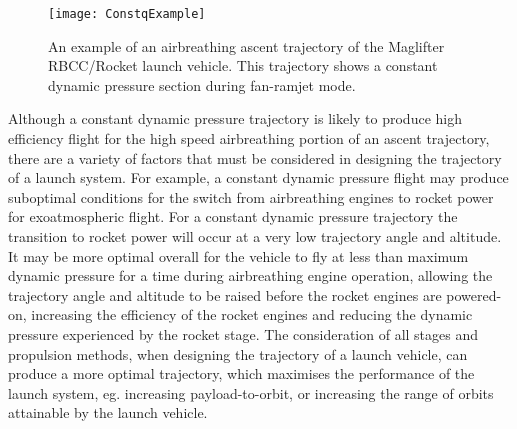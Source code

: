 \begin{figure}[ht]
	\centering
	\texttt{[image: ConstqExample]}
	\caption{An example of an airbreathing ascent trajectory of the Maglifter RBCC/Rocket launch vehicle\cite{Olds1998}. This trajectory shows a constant dynamic pressure section during fan-ramjet mode\cite{Olds1998}.}
	\label{fig:constqexample}
\end{figure}
Although a constant dynamic pressure trajectory is likely to produce high efficiency flight for the high speed airbreathing portion of an ascent trajectory, there are a variety of factors that must be considered in designing the trajectory of a launch system. 
For example, a constant dynamic pressure flight may produce suboptimal conditions for the switch from airbreathing engines to rocket power for exoatmospheric flight. 
 For a constant dynamic pressure trajectory the transition to rocket power will occur at a very low trajectory angle and altitude\cite{Preller2017b}. 
 It may be more optimal overall for the vehicle to fly at less than maximum dynamic pressure for a time during airbreathing engine operation, allowing the trajectory angle and altitude to be raised before the rocket engines are powered-on, increasing the efficiency of the rocket engines and reducing the dynamic pressure experienced by the rocket stage\cite{Tsuchiya2005,Wilhite1991,Mehta2001}.
 The consideration of all stages and propulsion methods, when designing the trajectory of a launch vehicle, can produce a more optimal trajectory, which maximises the performance of the launch system, eg. increasing payload-to-orbit, or increasing the range of orbits attainable by the launch vehicle.

